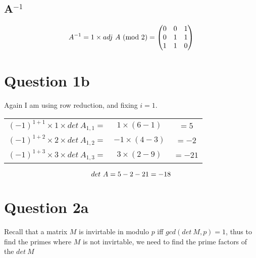 \documentclass{article}
\numberwithin{equation}{subsection}
\begin{document}
	\vspace{10pt}
	\subsection*{A$^{-1}$}
	\begin{adjustwidth}{2em}{2em}
		\begin{equation}\notag
			A^{-1} = 1 \times adj \ A \ (\textrm{mod}\ 2) = \begin{pmatrix}
																										0 & 0 & 1 \\
																										0 & 1 & 1 \\
																										1 & 1 & 0
																									\end{pmatrix}	
		\end{equation}	
	\end{adjustwidth}

	\newpage
	\thispagestyle{fancy}

	\section*{Question 1b}
	\par{
		Again I am using row reduction, and fixing $i=1$.
	}

	\begin{tabular}{c c c}
		$(-1)^{1+1} \times 1 \times det \ A_{1,1} =$ & $1 \times (6-1)$ & $= 5$ \\
		$(-1)^{1+2} \times 2 \times det \ A_{1,2} =$ & $-1 \times (4-3)$ & $= -2$ \\
		$(-1)^{1+3} \times 3 \times det \ A_{1,3} =$ & $3 \times (2-9)$ & $= -21$
	\end{tabular}

	\vspace{10pt}
	\begin{equation}\notag
		det\ A = 5 -2 - 21 = -18
	\end{equation}

	\vspace{30pt}
	\section*{Question 2a}
	\par{
		Recall that a matrix $M$ is invirtable in modulo $p$ iff $gcd(det \ M, p) =1$, 
		thus to find the primes where $M$ is not invirtable, we need to find the prime
		factors of the $det \ M$
	}
\end{document}
